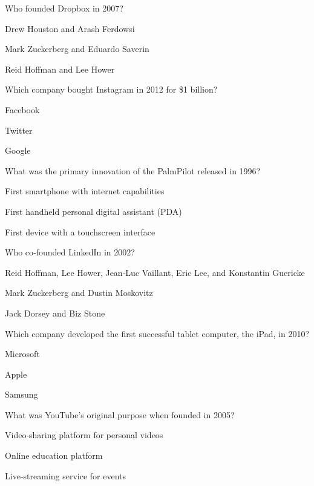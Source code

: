 \begin{enhancedmcq}{Who founded Dropbox in 2007?}
\item Drew Houston and Arash Ferdowsi
\item Mark Zuckerberg and Eduardo Saverin
\item Reid Hoffman and Lee Hower

\end{enhancedmcq}
\begin{enhancedmcq}{Which company bought Instagram in 2012 for \$1 billion?}
\item Facebook
\item Twitter
\item Google

\end{enhancedmcq}
\begin{enhancedmcq}{What was the primary innovation of the PalmPilot released in 1996?}
\item First smartphone with internet capabilities
\item First handheld personal digital assistant (PDA)
\item First device with a touchscreen interface

\end{enhancedmcq}
\begin{enhancedmcq}{Who co‑founded LinkedIn in 2002?}
\item Reid Hoffman, Lee Hower, Jean‑Luc Vaillant, Eric Lee, and Konstantin Guericke
\item Mark Zuckerberg and Dustin Moskovitz
\item Jack Dorsey and Biz Stone

\end{enhancedmcq}
\begin{enhancedmcq}{Which company developed the first successful tablet computer, the iPad, in 2010?}
\item Microsoft
\item Apple
\item Samsung

\end{enhancedmcq}
\begin{enhancedmcq}{What was YouTube's original purpose when founded in 2005?}
\item Video‑sharing platform for personal videos
\item Online education platform
\item Live‑streaming service for events

\end{enhancedmcq}
